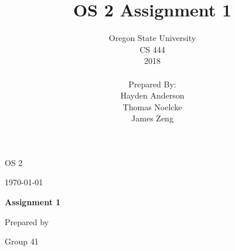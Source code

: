 \documentclass[draftclsnofoot, onecolumn, compsoc, 10pt]{IEEEtran}
\title{OS 2 Assignment 1}
\author{Oregon State University\\CS 444\\2018\\\\Prepared By:\\Hayden
Anderson\\Thomas Noelcke\\James Zeng\\}
\def \CapstoneTeamNumber{		41	}
\def \CapstoneProjectName{		Assignment 1 }
\begin{document}
\begin{titlepage}
    \begin{singlespace}
        \hfill
        \par\vspace{.2in}
        \centering
        \scshape{
            \huge OS 2 \par
            {\large\today}\par
            \vspace{1in}
            \textbf{\Huge\CapstoneProjectName}\par
            \vspace{1in}
            {\large Prepared by }\par
            Group\CapstoneTeamNumber\par
            \vspace{5pt}
            \vspace{20pt}
        }
        \vfill
    \end{singlespace}
\end{titlepage}
\newpage
{}
\clearpage
\tableofcontents
\pagebreak
\end{document}
